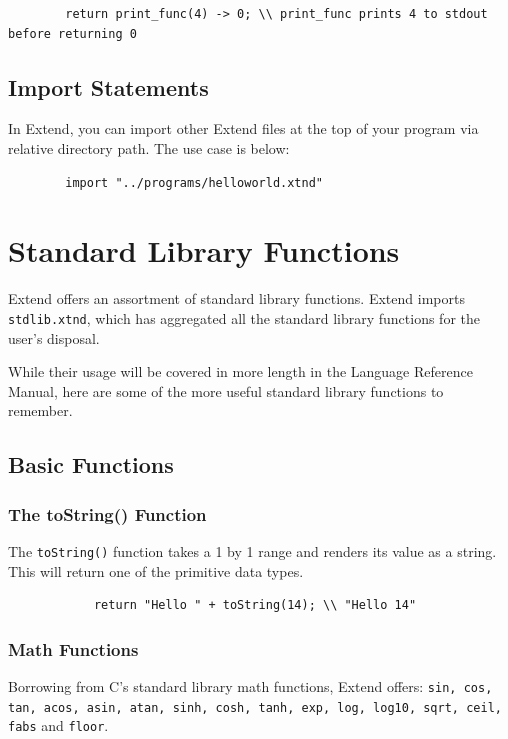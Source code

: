 	\begin{lstlisting}
		return print_func(4) -> 0; \\ print_func prints 4 to stdout before returning 0
	\end{lstlisting}

	\subsection{Import Statements}
	In Extend, you can import other Extend files at the top of your program via relative directory path. The use case is below:

	\begin{lstlisting}
		import "../programs/helloworld.xtnd"
	\end{lstlisting}

\section{Standard Library Functions}
Extend offers an assortment of standard library functions. Extend imports \texttt{stdlib.xtnd}, which has aggregated all the standard library functions for the user's disposal.

\medskip \noindent
While their usage will be covered in more length in the Language Reference Manual, here are some of the more useful standard library functions to remember.
	\subsection{Basic Functions}
		\subsubsection{The toString() Function}
		The \texttt{toString()} function takes a 1 by 1 range and renders its value as a string. This will return one of the primitive data types.

		\begin{lstlisting}
			return "Hello " + toString(14); \\ "Hello 14"
		\end{lstlisting}

		\subsubsection{Math Functions}
		Borrowing from C's standard library math functions, Extend offers: \texttt{sin, cos, tan, acos, asin, atan, sinh, cosh, tanh, exp, log, log10, sqrt, ceil, fabs} and \texttt{floor}.

